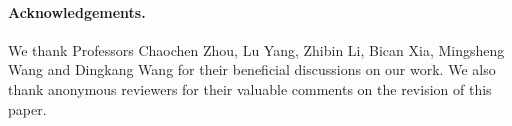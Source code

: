 \documentclass{article}
\newcommand{\rulex}{\hfill\rule{1mm}{3mm}}
\begin{document}
\paragraph{Acknowledgements.} We thank Professors Chaochen Zhou, Lu Yang, Zhibin Li, Bican Xia, Mingsheng Wang and Dingkang Wang for their beneficial discussions on our work. We also thank anonymous reviewers for their valuable comments on the revision of this paper.






%

%



\end{document}
